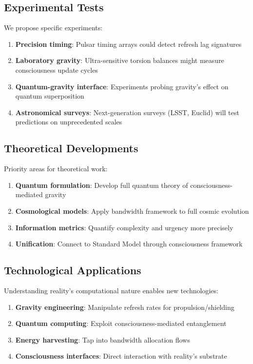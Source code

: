 \documentclass[twocolumn,prd,amsmath,amssymb,aps,superscriptaddress,nofootinbib]{revtex4-2}
\begin{document}
\subsection{Experimental Tests}

We propose specific experiments:

\begin{enumerate}
\item \textbf{Precision timing}: Pulsar timing arrays could detect refresh lag signatures
\item \textbf{Laboratory gravity}: Ultra-sensitive torsion balances might measure consciousness update cycles
\item \textbf{Quantum-gravity interface}: Experiments probing gravity's effect on quantum superposition
\item \textbf{Astronomical surveys}: Next-generation surveys (LSST, Euclid) will test predictions on unprecedented scales
\end{enumerate}

\subsection{Theoretical Developments}

Priority areas for theoretical work:

\begin{enumerate}
\item \textbf{Quantum formulation}: Develop full quantum theory of consciousness-mediated gravity
\item \textbf{Cosmological models}: Apply bandwidth framework to full cosmic evolution
\item \textbf{Information metrics}: Quantify complexity and urgency more precisely
\item \textbf{Unification}: Connect to Standard Model through consciousness framework
\end{enumerate}

\subsection{Technological Applications}

Understanding reality's computational nature enables new technologies:

\begin{enumerate}
\item \textbf{Gravity engineering}: Manipulate refresh rates for propulsion/shielding
\item \textbf{Quantum computing}: Exploit consciousness-mediated entanglement
\item \textbf{Energy harvesting}: Tap into bandwidth allocation flows
\item \textbf{Consciousness interfaces}: Direct interaction with reality's substrate
\end{enumerate}
\end{document}
